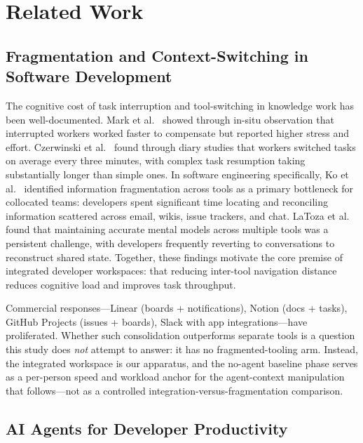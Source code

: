 \section{Related Work}
\label{sec:related}

\subsection{Fragmentation and Context-Switching in Software Development}
\label{sec:related:fragmentation}

The cognitive cost of task interruption and tool-switching in knowledge work has
been well-documented. Mark et al.~\cite{mark2008cost} showed through in-situ
observation that interrupted workers worked faster to compensate but reported
higher stress and effort. Czerwinski et al.~\cite{czerwinski2004diary} found
through diary studies that workers switched tasks on average every three
minutes, with complex task resumption taking substantially longer than simple
ones. In software engineering specifically, Ko et al.~\cite{ko2007information}
identified information fragmentation across tools as a primary bottleneck for
collocated teams: developers spent significant time locating and reconciling
information scattered across email, wikis, issue trackers, and chat. LaToza
et al.~\cite{latoza2006maintaining} found that maintaining accurate mental
models across multiple tools was a persistent challenge, with developers
frequently reverting to conversations to reconstruct shared state. Together,
these findings motivate the core premise of integrated developer workspaces:
that reducing inter-tool navigation distance reduces cognitive load and
improves task throughput.

Commercial responses---Linear (boards + notifications), Notion (docs +
tasks), GitHub Projects (issues + boards), Slack with app integrations---have
proliferated. Whether such consolidation outperforms separate tools is a
question this study does \emph{not} attempt to answer: it has no
fragmented-tooling arm. Instead, the integrated workspace is our apparatus, and
the no-agent baseline phase serves as a per-person speed and workload anchor for
the agent-context manipulation that follows---not as a controlled
integration-versus-fragmentation comparison.

\subsection{AI Agents for Developer Productivity}
\label{sec:related:agents}

